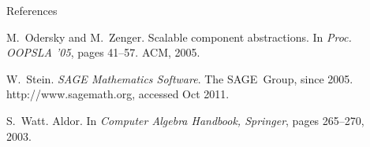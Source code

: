 \documentclass[final]{beamer}
\begin{document}
\begin{frame}[fragile]
\begin{columns}[t]
\begin{column}{.3\linewidth}
\begin{block}{\large References}
\begin{thebibliography}{1}
\def\newblock{}
M.~Odersky and M.~Zenger.
\newblock Scalable component abstractions.
\newblock In {\em Proc. OOPSLA '05}, pages 41--57. ACM, 2005.

\def\newblock{}
W.~Stein.
\newblock {\em {SAGE} {M}athematics {S}oftware}.
\newblock The SAGE~Group, since 2005.
\newblock http://www.sagemath.org, accessed Oct 2011.

\def\newblock{}
S.~Watt.
\newblock Aldor.
\newblock In {\em Computer Algebra Handbook, Springer}, pages 265--270, 2003.

\end{thebibliography}

  \end{block}
\end{column}


\begin{column}{.3\linewidth}


\end{column}
\end{columns}
\end{frame}
\end{document}
